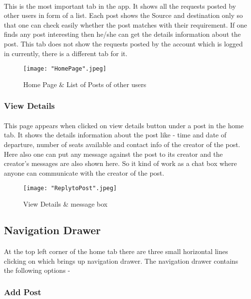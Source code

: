 \documentclass[12pt, a4paper]{article}
\begin{document}
\paragraph{}
This is the most important tab in the app. It shows all the requests posted by other users in form of a list. Each post shows the Source and destination only so that one can check easily whether the post matches with their requirement. If one finds any post interesting then he/she can get the details information about the post. This tab does not show the requests posted by the account which is logged in currently, there is a different tab for it.
\\
\begin{figure}[htp]
    \centering
    \texttt{[image: "HomePage".jpeg]}
    \caption{Home Page \& List of Posts of other users}
\end{figure}
\newpage
\subsubsection{View Details}
\paragraph{}
This page appears when clicked on view details button under a post in the home tab. It shows the details information about the post like - time and date of departure, number of seats available and contact info of the creator of the post. Here also one can put any message against the post to its creator and the creator's messages are also shown here. So it kind of work as a chat box where anyone can communicate with the creator of the post.
\\
\begin{figure}[htp]
    \centering
    \texttt{[image: "ReplytoPost".jpeg]}
    \caption{View Details \& message box}
\end{figure}
\newpage
\subsection{Navigation Drawer}
\paragraph{}
At the top left corner of the home tab there are three small horizontal lines clicking on which brings up  navigation drawer. The navigation drawer contains the following options - 
\subsubsection{Add Post}
\end{document}
